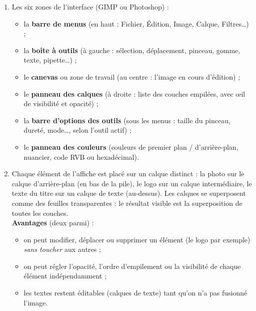 \documentclass[11pt]{article}
\newcommand{\cle}[1]{{\popxbold\color{popdark}#1}}
\begin{document}
\begin{corrige}
\begin{enumerate}
  \item Les six zones de l'interface (GIMP ou Photoshop) :
  \begin{itemize}
    \item la \textbf{barre de menus} (en haut : Fichier, Édition, Image, Calque, Filtres\ldots) ;
    \item la \textbf{boîte à outils} (à gauche : sélection, déplacement, pinceau, gomme, texte, pipette\ldots) ;
    \item le \textbf{canevas} ou zone de travail (au centre : l'image en cours d'édition) ;
    \item le \textbf{panneau des calques} (à droite : liste des couches empilées, avec œil de visibilité et opacité) ;
    \item la \textbf{barre d'options des outils} (sous les menus : taille du pinceau, dureté, mode\ldots, selon l'outil actif) ;
    \item le \textbf{panneau des couleurs} (couleurs de premier plan / d'arrière-plan, nuancier, code RVB ou hexadécimal).
  \end{itemize}
  \item Chaque élément de l'affiche est placé sur un \cle{calque} distinct : la photo sur le calque d'arrière-plan (en bas de la pile), le logo sur un calque intermédiaire, le texte du titre sur un calque de texte (au-dessus). Les calques se superposent comme des feuilles transparentes : le résultat visible est la superposition de toutes les couches.\\
  \textbf{Avantages} (deux parmi) :
  \begin{itemize}
    \item on peut modifier, déplacer ou supprimer un élément (le logo par exemple) \emph{sans toucher} aux autres ;
    \item on peut régler l'opacité, l'ordre d'empilement ou la visibilité de chaque élément indépendamment ;
    \item les textes restent éditables (calques de texte) tant qu'on n'a pas fusionné l'image.
  \end{itemize}
\end{enumerate}
\end{corrige}
\end{document}
